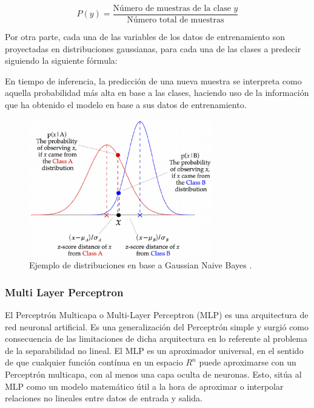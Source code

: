 \documentclass{uathesis-es}
\begin{document}
\[
    P(y) = \frac{\text{Número de muestras de la clase } y}{\text{Número total de muestras}}
\]

Por otra parte, cada una de las variables de los datos de entrenamiento son proyectadas en distribuciones gaussianas, para cada una de las clases a predecir siguiendo la siguiente fórmula:


En tiempo de inferencia, la predicción de una nueva muestra se interpreta como aquella probabilidad más alta en base a las clases, haciendo uso de la información que ha obtenido el modelo en base a sus datos de entrenamiento.


\begin{figure}[H]
    \centering
    \includegraphics[width=8cm]{Figures/Background/GNB.png}
    \caption{Ejemplo de distribuciones en base a Gaussian Naive Bayes \cite{GNBIMAGE}.}
    \label{GA_inicializacion}
\end{figure}


\subsubsection*{Multi Layer Perceptron}




El Perceptrón Multicapa o Multi-Layer Perceptron (MLP) es una arquitectura de red neuronal artificial. Es una generalización del Perceptrón simple y surgió como consecuencia de las limitaciones de dicha arquitectura en lo referente al problema de la separabilidad no lineal. El MLP es un aproximador universal, en el sentido de que cualquier función contínua en un espacio $R^n$ puede aproximarse con un Perceptrón multicapa, con al menos una capa oculta de neuronas. Esto, sitúa al MLP como un modelo matemático útil a la hora de aproximar o interpolar relaciones no lineales entre datos de entrada y salida.
\end{document}

